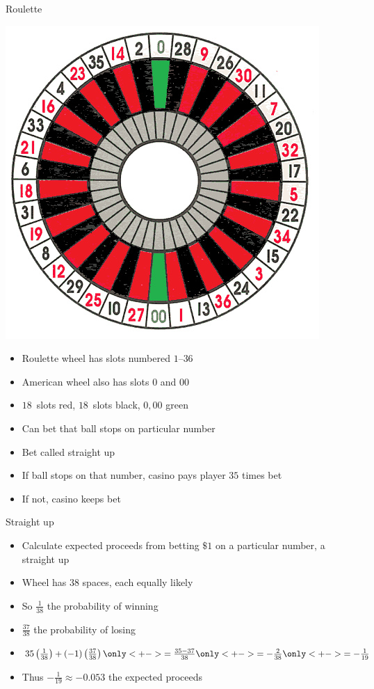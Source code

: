 \documentclass[handout]{beamer}
\theoremstyle{definition}
\begin{document}
\begin{frame}{Roulette}
\begin{multicols}{2}
\includegraphics[scale=.38]{Roulette}
\begin{itemize}
\item Roulette wheel has slots numbered $1$--$36$
\columnbreak
\item American wheel also has slots $0$ and $00$
\item $18$~slots red, $18$~slots black, $0,00$ green
\item Can bet that ball stops on particular number
\item Bet called \alert{straight up}
\item If ball stops on that number, casino pays player
$35$ times bet
\item If not, casino keeps bet
\end{itemize}
\end{multicols}
\end{frame}

\begin{frame}{Straight up}
\begin{itemize}
\item Calculate expected proceeds from betting $\$1$
on a particular number, a \alert{straight up}
\item Wheel has $38$ spaces, each equally likely
\item So $\frac{1}{38}$ the probability of winning
\item $\frac{37}{38}$ the probability of losing
\item $35\left(\frac{1}{38}\right)
+\left(-1\right)\left(\frac{37}{38}\right)
\only<+->{=\frac{35-37}{38}}
\only<+->{=-\frac{2}{38}}
\only<+->{=-\frac{1}{19}}$
\item Thus $-\frac{1}{19}\approx -0.053$ the expected proceeds
\end{itemize}
\end{frame}
\end{document}
